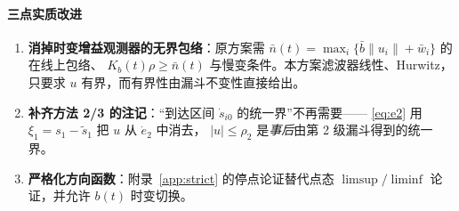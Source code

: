 \documentclass[11pt,a4paper]{article}
\theoremstyle{plain}
\theoremstyle{definition}
\theoremstyle{remark}
\begin{document}
\paragraph{三点实质改进}
\begin{enumerate}[label=(\arabic*)]
\item \textbf{消掉时变增益观测器的无界包络}：原方案需
$\bar n(t)=\max_i\{\bar b\|u_i\|+\bar w_i\}$ 的在线上包络、
$K_b(t)\rho\ge\bar n(t)$ 与慢变条件。本方案滤波器线性、Hurwitz，
只要求 $u$ 有界，而有界性由漏斗不变性直接给出。
\item \textbf{补齐方法 2/3 的注记}：“到达区间 $\dot s_{i0}$ 的统一界”不再需要——
\eqref{eq:e2} 用 $\xi_1=s_1-\tilde s_1$ 把 $u$ 从 $\dot e_2$ 中消去，
$|u|\le\rho_2$ 是\emph{事后}由第 2 级漏斗得到的统一界。
\item \textbf{严格化方向函数}：附录~\ref{app:strict} 的停点论证替代点态
$\limsup/\liminf$ 论证，并允许 $b(t)$ 时变切换。
\end{enumerate}

\end{document}
